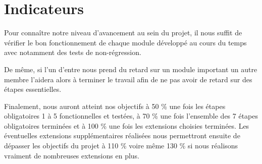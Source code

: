 \documentclass[a4paper, 11pt, titlepage]{article}
\begin{document}
\section{Indicateurs}

Pour connaître notre niveau d'avancement au sein du projet, il nous suffit de vérifier le bon fonctionnement de chaque module développé au cours du temps avec notamment des tests de non-régression.

De même, si l'un d'entre nous prend du retard sur un module important un autre membre l'aidera alors à terminer le travail afin de ne pas avoir de retard sur des étapes essentielles.

Finalement, nous auront atteint nos objectifs à 50 \% une fois les étapes obligatoires 1 à 5 fonctionnelles et testées, à 70 \% une fois l'ensemble des 7 étapes obligatoires terminées et à 100 \% une fois les extensions choisies terminées. Les éventuelles extensions supplémentaires réalisées nous permettront ensuite de dépasser les objectifs du projet à 110 \% voire même 130 \% si nous réalisons vraiment de nombreuses extensions en plus.
\end{document}
